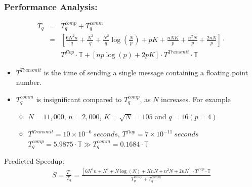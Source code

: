 \documentclass{beamer}
\begin{document}
\begin{frame}
\frametitle{Performance Analysis:}
\begin{eqnarray}
T_q&=&T^{comp}_q+T^{comm}_q \nonumber \\
&=&[\frac{6N^2n}{q}+\frac{N^2}{q}+\frac{N^2}{q}\log(\frac{N}{p})+pK+\frac{nNK}{p}+\frac{n^2N}{p}+\frac{2nN}{p}] \cdot\nonumber \\
&& T^{flop} \cdot \mathbb{T}+[np\log(p)+2pK] \cdot T^{Transmit} \cdot \mathbb{T} \nonumber
\end{eqnarray}

\begin{itemize}
\item $T^{Transmit}$ is the time of sending a single message containing a floating point number.
\item $T^{comm}_q$ is insignificant compared to $T^{comp}_q$, as $N$ increases.
For example
\begin{itemize}
\item $N=11,000$, $n=2,000$, $K=\sqrt{N}=105$ and $q=16 (p=4)$
\item $T^{Transmit}=10 \times 10^{-6}~seconds$, $T^{flop}=7 \times 10^{-11}~seconds$
$T^{comp}_q= 5.9875 \cdot \mathbb{T} \gg T^{comm}_q= 0.1684 \cdot \mathbb{T}$
\end{itemize}
\end{itemize}
Predicted Speedup:
\begin{eqnarray}
S=\frac{T_1}{T_q}=\frac{[6N^2n+N^2+N\log(N)+KnN+n^2N+2nN] \cdot T^{flop} \cdot \mathbb{T}}{T^{comp}_q+T^{comm}_q} \nonumber
\end{eqnarray}
\end{frame}
\end{document}
